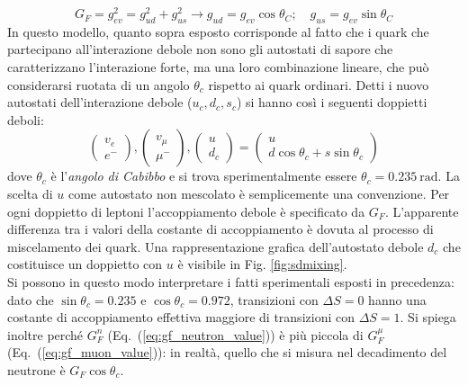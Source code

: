 \documentclass{subnucbo}
\begin{document}
\begin{equation}
        G _ { F } = g _ { e v } ^ { 2 } = g _ { u d } ^ { 2 } + g _ { u s } ^ { 2 } \longrightarrow g _ { u d } = g _ { e v } \cos \theta _ { C } ; \quad g _ { u s } = g _ { e v } \sin \theta _ { C }
\end{equation}
In questo modello, quanto sopra esposto corrisponde al fatto che i quark che partecipano all'interazione debole non sono gli autostati di sapore che caratterizzano l'interazione forte, ma una loro combinazione lineare, che può considerarsi ruotata di un angolo $\theta_{c}$ rispetto ai quark ordinari. Detti i nuovo autostati dell'interazione debole ($u_{c}, d_{c}, s_{c}$) si hanno così i seguenti doppietti deboli:
\begin{equation}
        \left( \begin{array} { c } { v _ { e } } \\ { e ^ { - } } \end{array} \right) , \left( \begin{array} { c } { v _ { \mu } } \\ { \mu ^ { - } } \end{array} \right) , \left( \begin{array} { c } { u } \\ { d _ { c } } \end{array} \right) = \left( \begin{array} { c } { u } \\ { d \cos \theta _ { c } + s \sin \theta _ { c } } \end{array} \right)
        \label{eq:weak_doublets}
\end{equation}
dove $\theta_{c}$ è l'\textit{angolo di Cabibbo} e si trova sperimentalmente essere $\theta _ { c } = 0.235\: \mathrm { rad }$. La scelta di $u$ come autostato non mescolato è semplicemente una convenzione. Per ogni doppietto di leptoni l'accoppiamento debole è specificato da $G_{F}$. L'apparente differenza tra i valori della costante di accoppiamento è dovuta al processo di miscelamento dei quark. Una rappresentazione grafica dell'autostato debole $d_{c}$ che costituisce un doppietto con $u$ è visibile in Fig. \ref{fig:sdmixing}.\\
Si possono in questo modo interpretare i fatti sperimentali esposti in precedenza: dato che $\sin\theta_{c}=0.235$ e $\cos\theta_{c}=0.972$, transizioni con $\Delta S = 0$ hanno una costante di accoppiamento effettiva maggiore di transizioni con $\Delta S = 1$. Si spiega inoltre perché $G_{F}^{n}$ (Eq.~(\ref{eq:gf_neutron_value})) è più piccola di $G_{F}^{\mu}$ (Eq.~(\ref{eq:gf_muon_value})): in realtà, quello che si misura nel decadimento del neutrone è $G_{F}\cos \theta_{c}$.
\end{document}
